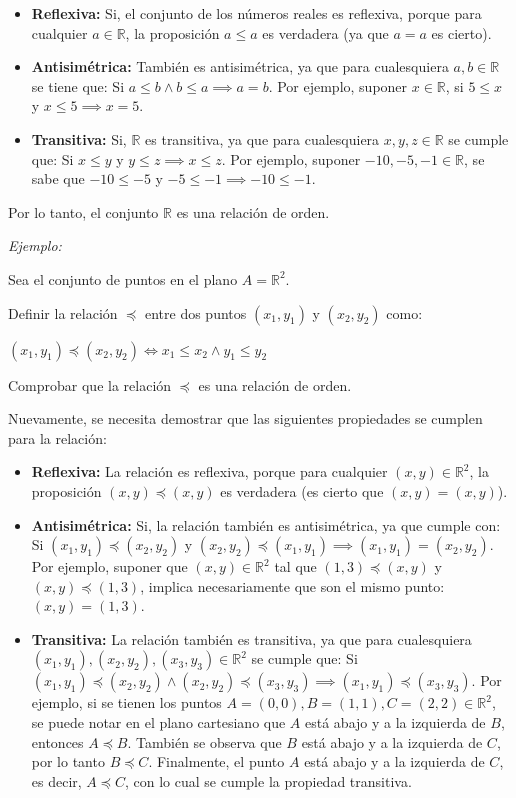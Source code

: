 \documentclass{article}
\begin{document}
\begin{itemize}
    \item \textbf{Reflexiva:} Si, el conjunto de los números reales es reflexiva, porque para cualquier $a \in \mathbb{R}$, la proposición $a \le a$ es verdadera (ya que $a = a$ es cierto).
    \item \textbf{Antisimétrica:} También es antisimétrica, ya que para cualesquiera $a, b \in \mathbb{R}$ se tiene que: Si $a \le b \land b \le a \implies a = b$. Por ejemplo, suponer $x \in \mathbb{R}$, si $5 \le x$ y $x \le 5 \implies x = 5$.
    \item \textbf{Transitiva:} Si, $\mathbb{R}$ es transitiva, ya que para cualesquiera $x, y, z \in \mathbb{R}$ se cumple que: Si $x \le y$ y $y \le z \implies x \le z$. Por ejemplo, suponer $-10, -5, -1 \in \mathbb{R}$, se sabe que $-10 \le -5$ y $-5 \le -1 \implies -10 \le -1$. 
\end{itemize}

Por lo tanto, el conjunto $\mathbb{R}$ es una relación de orden.

\textit{Ejemplo:}

Sea el conjunto de puntos en el plano $A = \mathbb{R}^2$.

Definir la relación $\preceq$ entre dos puntos $(x_1, y_1)$ y $(x_2, y_2)$ como:

$(x_1, y_1) \preceq (x_2, y_2) \iff x_1 \le x_2 \land y_1 \le y_2$

Comprobar que la relación $\preceq$ es una relación de orden.

Nuevamente, se necesita demostrar que las siguientes propiedades se cumplen para la relación:

\begin{itemize}
    \item \textbf{Reflexiva:} La relación es reflexiva, porque para cualquier $(x, y) \in \mathbb{R}^2$, la proposición $(x, y) \preceq (x, y)$ es verdadera (es cierto que $(x, y) = (x, y)$). 
    \item \textbf{Antisimétrica:} Si, la relación también es antisimétrica, ya que cumple con: Si $(x_1, y_1) \preceq (x_2, y_2)$ y $(x_2, y_2) \preceq (x_1, y_1) \implies (x_1, y_1) = (x_2, y_2)$. Por ejemplo, suponer que $(x, y) \in \mathbb{R}^2$ tal que $(1, 3) \preceq (x, y)$ y $(x, y) \preceq (1, 3)$, implica necesariamente que son el mismo punto: $(x, y) = (1, 3)$.
    \item \textbf{Transitiva:} La relación también es transitiva, ya que para cualesquiera $(x_1, y_1), (x_2, y_2), (x_3, y_3) \in \mathbb{R}^2$ se cumple que: Si $(x_1, y_1) \preceq (x_2, y_2) \land (x_2, y_2) \preceq (x_3, y_3) \implies (x_1, y_1) \preceq (x_3, y_3).$ Por ejemplo, si se tienen los puntos $A = (0, 0), B= (1, 1), C = (2, 2) \in \mathbb{R}^2$, se puede notar en el plano cartesiano que $A$ está abajo y a la izquierda de $B$, entonces $A \preceq B$. También se observa que $B$ está abajo y a la izquierda de $C$, por lo tanto $B \preceq C$. Finalmente, el punto $A$ está abajo y a la izquierda de $C$, es decir, $A \preceq C$, con lo cual se cumple la propiedad transitiva. 
\end{itemize}
\end{document}
